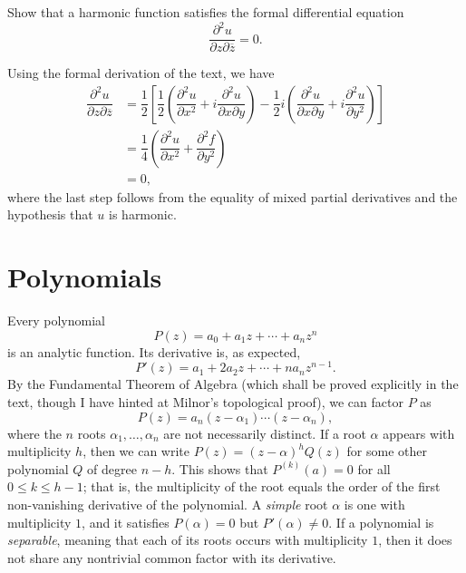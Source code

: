 \begin{exercise}
	Show that a harmonic function satisfies the formal differential equation $$\dfrac{\partial^2 u}{\partial z \partial \overline{z}}=0.$$
	
	\begin{sol}
		Using the formal derivation of the text, we have
		\begin{align*}
			\dfrac{\partial^2 u}{\partial z\partial \overline{z}} &=\dfrac{1}{2}\left[\dfrac{1}{2}\left(\dfrac{\partial^2 u}{\partial x^2}+i\dfrac{\partial^2 u}{\partial x \partial y}\right)-\dfrac{1}{2}i\left(\dfrac{\partial^2 u}{\partial x \partial y}+i\dfrac{\partial^2 u}{\partial y^2}\right)\right] \\
			&=\dfrac{1}{4}\left(\dfrac{\partial^2 u}{\partial x^2}+\dfrac{\partial^2 f}{\partial y^2}\right) \\
			&=0,
		\end{align*}
		where the last step follows from the equality of mixed partial derivatives and the hypothesis that $u$ is harmonic.
	\end{sol}
\end{exercise}

\section{Polynomials}
Every polynomial $$P(z)=a_0+a_1z+\cdots+a_nz^n$$ is an analytic function. Its derivative is, as expected, $$P'(z)=a_1+2a_2z+\cdots+na_nz^{n-1}.$$ By the Fundamental Theorem of Algebra (which shall be proved explicitly in the text, though I have hinted at Milnor's topological proof), we can factor $P$ as $$P(z)=a_n(z-\alpha_1) \cdots (z-\alpha_n),$$ where the $n$ roots $\alpha_1,\dots,\alpha_n$ are not necessarily distinct. If a root $\alpha$ appears with multiplicity $h$, then we can write $P(z)=(z-\alpha)^hQ(z)$ for some other polynomial $Q$ of degree $n-h$. This shows that $P^{(k)}(a)=0$ for all $0 \le k \le h-1$; that is, the multiplicity of the root equals the order of the first non-vanishing derivative of the polynomial. A \textit{simple} root $\alpha$ is one with multiplicity $1$, and it satisfies $P(\alpha)=0$ but $P'(\alpha) \neq 0$. If a polynomial is \textit{separable}, meaning that each of its roots occurs with multiplicity $1$, then it does not share any nontrivial common factor with its derivative.

